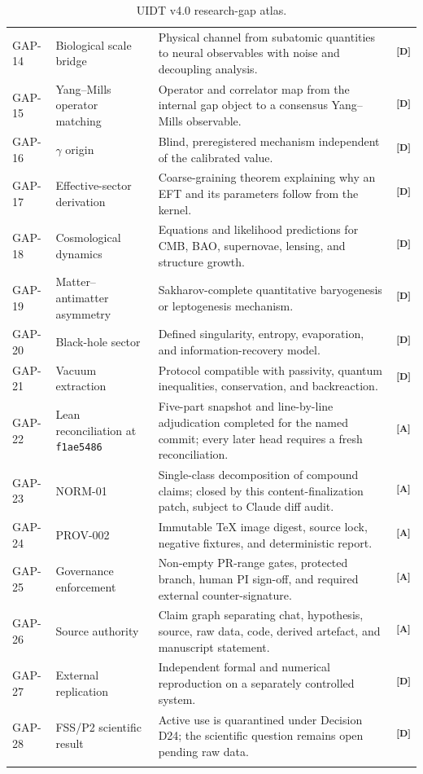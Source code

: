 \documentclass[12pt,a4paper,twoside]{article}
\theoremstyle{plain}
\theoremstyle{definition}
\theoremstyle{remark}
\newcommand{\catmark}[1]{\textsuperscript{\textsf{\textbf{[#1]}}}}
\begin{document}
\begin{longtable}{@{}p{1.05cm}p{4.15cm}p{6.45cm}p{1.05cm}@{}}
GAP-14 & Biological scale bridge & Physical channel from subatomic quantities
to neural observables with noise and decoupling analysis. & \catmark{D}\\
GAP-15 & Yang--Mills operator matching & Operator and correlator map from the
internal gap object to a consensus Yang--Mills observable. & \catmark{D}\\
GAP-16 & $\gamma$ origin & Blind, preregistered mechanism independent of the
calibrated value. & \catmark{D}\\
GAP-17 & Effective-sector derivation & Coarse-graining theorem explaining why
an EFT and its parameters follow from the kernel. & \catmark{D}\\
GAP-18 & Cosmological dynamics & Equations and likelihood predictions for CMB,
BAO, supernovae, lensing, and structure growth. & \catmark{D}\\
GAP-19 & Matter--antimatter asymmetry & Sakharov-complete quantitative
baryogenesis or leptogenesis mechanism. & \catmark{D}\\
GAP-20 & Black-hole sector & Defined singularity, entropy, evaporation, and
information-recovery model. & \catmark{D}\\
GAP-21 & Vacuum extraction & Protocol compatible with passivity, quantum
inequalities, conservation, and backreaction. & \catmark{D}\\
GAP-22 & Lean reconciliation at \texttt{f1ae5486} & Five-part snapshot and line-by-line adjudication completed for the named commit; every later head requires a fresh reconciliation. & \catmark{A}\\
GAP-23 & NORM-01 & Single-class decomposition of compound claims; closed by this content-finalization patch, subject to Claude diff audit. & \catmark{A}\\
GAP-24 & PROV-002 & Immutable TeX image digest, source lock, negative fixtures,
and deterministic report. & \catmark{A}\\
GAP-25 & Governance enforcement & Non-empty PR-range gates, protected branch,
human PI sign-off, and required external counter-signature. & \catmark{A}\\
GAP-26 & Source authority & Claim graph separating chat, hypothesis, source,
raw data, code, derived artefact, and manuscript statement. & \catmark{A}\\
GAP-27 & External replication & Independent formal and numerical reproduction
on a separately controlled system. & \catmark{D}\\
GAP-28 & FSS/P2 scientific result & Active use is quarantined under Decision D24; the scientific question remains open pending raw data. & \catmark{D}\\
\bottomrule
\caption{UIDT v4.0 research-gap atlas.}
\label{tab:ctx-v4-gap-atlas}
\end{longtable}
\end{document}
